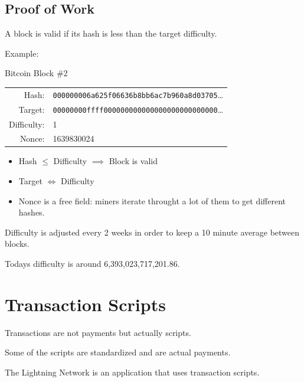 \documentclass{beamer}
\begin{document}
\subsection{Proof of Work}
\begin{frame}
    A block is valid if its hash is less than the target difficulty.

    \pause
    Example:
    \begin{block}{Bitcoin Block \#2}
        \begin{tabular}{ r l }
            Hash: &   \texttt{000000006a625f06636b8bb6ac7b960a8d03705}\ldots \\
            Target: & \texttt{00000000ffff000000000000000000000000000}\ldots \\
            Difficulty: & 1 \\
            Nonce: & 1639830024
        \end{tabular}
    \end{block}

    \pause
    \begin{itemize}
        \item Hash $\leq$ Difficulty $\implies$ Block is valid
        \item Target $\iff$ Difficulty
        \item Nonce is a free field: miners iterate throught a lot of them to
            get different hashes.
    \end{itemize}

    \pause
    Difficulty is adjusted every 2 weeks in order to keep a 10 minute average
    between blocks.

    \pause
    Todays difficulty is around 6,393,023,717,201.86.
\end{frame}

\section{Transaction Scripts}
\begin{frame}
    Transactions are not payments \pause but actually scripts.

    \pause
    Some of the scripts are standardized and are actual payments.

    \pause
    The Lightning Network is an application that uses transaction scripts.
\end{frame}
\end{document}

